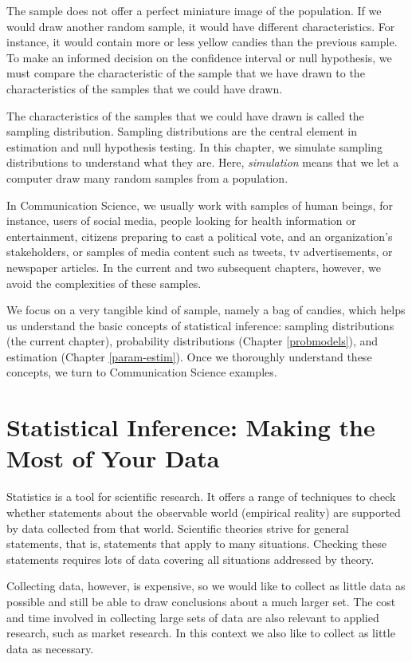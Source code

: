 \documentclass[a4paper]{book}
\theoremstyle{definition}
\theoremstyle{definition}
\theoremstyle{definition}
\theoremstyle{remark}
\begin{document}
The sample does not offer a perfect miniature image of the population.
If we would draw another random sample, it would have different
characteristics. For instance, it would contain more or less yellow
candies than the previous sample. To make an informed decision on the
confidence interval or null hypothesis, we must compare the
characteristic of the sample that we have drawn to the characteristics
of the samples that we could have drawn.

The characteristics of the samples that we could have drawn is called
the sampling distribution. Sampling distributions are the central
element in estimation and null hypothesis testing. In this chapter, we
simulate sampling distributions to understand what they are. Here,
\emph{simulation} means that we let a computer draw many random samples
from a population.

In Communication Science, we usually work with samples of human beings,
for instance, users of social media, people looking for health
information or entertainment, citizens preparing to cast a political
vote, and an organization's stakeholders, or samples of media content
such as tweets, tv advertisements, or newspaper articles. In the current
and two subsequent chapters, however, we avoid the complexities of these
samples.

We focus on a very tangible kind of sample, namely a bag of candies,
which helps us understand the basic concepts of statistical inference:
sampling distributions (the current chapter), probability distributions
(Chapter \ref{probmodels}), and estimation (Chapter \ref{param-estim}).
Once we thoroughly understand these concepts, we turn to Communication
Science examples.

\section{Statistical Inference: Making the Most of Your
Data}\label{statistical-inference-making-the-most-of-your-data}

Statistics is a tool for scientific research. It offers a range of
techniques to check whether statements about the observable world
(empirical reality) are supported by data collected from that world.
Scientific theories strive for general statements, that is, statements
that apply to many situations. Checking these statements requires lots
of data covering all situations addressed by theory.

Collecting data, however, is expensive, so we would like to collect as
little data as possible and still be able to draw conclusions about a
much larger set. The cost and time involved in collecting large sets of
data are also relevant to applied research, such as market research. In
this context we also like to collect as little data as necessary.
\end{document}
